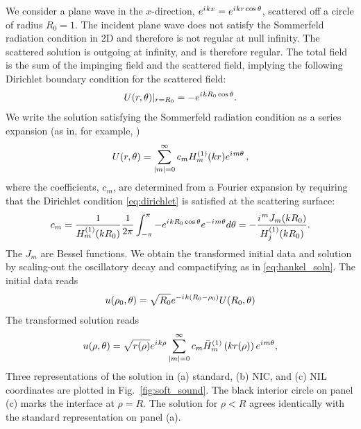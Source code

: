 \documentclass[final,onefignum,onetabnum]{siamart190516}
\newcommand{\iu}{{i\mkern1mu}}
\begin{document}
We consider a plane wave in the $x$-direction, $e^{\iu k x} = e^{\iu k r \cos\theta}$, scattered off a circle of radius $R_0=1$. The incident plane wave does not satisfy the Sommerfeld radiation condition in 2D and therefore is not regular at null infinity. The scattered solution is outgoing at infinity, and is therefore regular. The total field is the sum of the impinging field and the scattered field, implying the following Dirichlet boundary condition for the scattered field:
\begin{equation}\label{eq:dirichlet}
	U(r,\theta)|_{r=R_0} = - e^{\iu k R_0 \cos\theta}.
\end{equation}
We write the solution satisfying the Sommerfeld radiation condition as a series expansion (as in, for example, \cite{britt2010compact, yang2021truly})
\[ U(r,\theta) =  \sum_{|m|=0}^{\infty} c_m H_{m}^{(1)}(k r) e^{\iu m \theta} \,, \]
where the coefficients, $c_m$, are determined from a Fourier expansion by requiring that the Dirichlet condition \eqref{eq:dirichlet} is satisfied at the scattering surface:
\[ c_m = \frac{1}{H_{m}^{(1)}(k R_0)} \frac{1}{2\pi} \int_{-\pi}^{\pi} -e^{\iu k R_0 \cos\theta} e^{-\iu m \theta} d\theta = 
- \frac{\iu^m J_m(k R_0)}{H_{j}^{(1)}(k R_0)}. \]
The $J_m$ are Bessel functions. We obtain the transformed initial data and solution by scaling-out the oscillatory decay and compactifying as in \eqref{eq:hankel_soln}. The initial data reads
\[ u(\rho_0,\theta)= \sqrt{R_0} e^{-\iu k (R_0-\rho_0)} U(R_0,\theta) %
\]
The transformed solution reads
\begin{equation}\label{eq:soft_soln}
	u(\rho,\theta) = \sqrt{r(\rho)} e^{\iu k\rho} \sum_{|m|=0}^{\infty} c_m \bar{H}_{m}^{(1)}\left(k r(\rho)\right) e^{\iu m \theta},
\end{equation}
Three representations of the solution in (a) standard, (b) NIC, and (c) NIL coordinates are plotted in Fig.~\ref{fig:soft_sound}. The black interior circle on panel (c) marks the interface at $\rho=R$. The solution for $\rho<R$ agrees identically with the standard representation on panel (a). 
\end{document}
